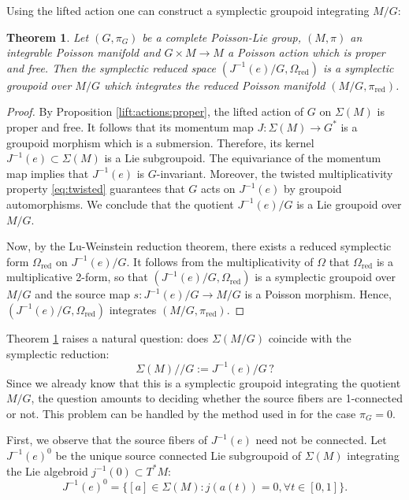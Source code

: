 \documentclass[a4paper,11pt]{amsart}
\newtheorem{thm}{Theorem}[section]
\theoremstyle{definition}
\theoremstyle{remark}
\begin{document}
Using the lifted action one can construct a symplectic groupoid integrating $M/G$:

\begin{thm}
\label{thm:int:M/G} Let $(G,\pi_G)$ be a complete Poisson-Lie group, $(M,\pi)$ an integrable Poisson manifold
and $G\times M\to M$ a Poisson action which is proper and free. Then the symplectic reduced space
$(J^{-1}(e)/G,\Omega_\text{red})$ is a symplectic groupoid over $M/G$ which integrates the reduced Poisson
manifold $(M/G,\pi_\text{red})$.
\end{thm}

\begin{proof}
By Proposition \ref{lift:actions:proper}, the lifted action of $G$ on $\Sigma(M)$ is proper and free. It follows
that its momentum map $J:\Sigma(M)\to G^*$ is a groupoid morphism which is a submersion. Therefore, its kernel
$J^{-1}(e)\subset\Sigma(M)$ is a Lie subgroupoid. The equivariance of the momentum map implies that $J^{-1}(e)$
is $G$-invariant. Moreover, the twisted multiplicativity property \eqref{eq:twisted} guarantees that $G$ acts on
$J^{-1}(e)$ by groupoid automorphisms. We conclude that the quotient $J^{-1}(e)/G$ is a Lie groupoid over $M/G$.

Now, by the Lu-Weinstein reduction theorem, there exists a reduced symplectic form $\Omega_\text{red}$ on
$J^{-1}(e)/G$. It follows from the multiplicativity of $\Omega$ that $\Omega_\text{red}$ is a multiplicative
2-form, so that $(J^{-1}(e)/G,\Omega_\text{red})$ is a symplectic groupoid over $M/G$ and the source map
$s:J^{-1}(e)/G\to M/G$ is a Poisson morphism. Hence, $(J^{-1}(e)/G,\Omega_\text{red})$ integrates
$(M/G,\pi_\text{red})$.
\end{proof}

Theorem \ref{thm:int:M/G} raises a natural question: does $\Sigma(M/G)$ coincide
with the symplectic reduction:
\[ \Sigma(M)//G:=J^{-1}(e)/G\, ? \]
Since we already know that this is a symplectic groupoid integrating the quotient $M/G$, the question amounts to
deciding whether the source fibers are 1-connected or not. This problem can be handled by the method used in
\cite{FerOrRa} for the case $\pi_G=0$.

First, we observe that the source fibers of $J^{-1}(e)$
need not be connected. Let $J^{-1}(e)^0$ be the
unique source connected Lie subgroupoid of $\Sigma (M)$
integrating the Lie algebroid $j^{-1}(0)\subset T^*M$:
\[
J^{-1}(e)^0=\{[a]\in \Sigma (M): j(a(t))=0,\forall t\in[0,1]\}.
\]
\end{document}
